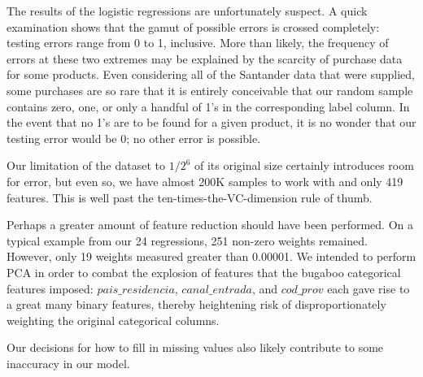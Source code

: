 \documentclass{report}
\begin{document}
The results of the logistic regressions are unfortunately suspect. A quick examination shows that the gamut of possible errors is crossed completely: testing errors range from 0 to 1, inclusive. More than likely, the frequency of errors at these two extremes may be explained by the scarcity of purchase data for some products. Even considering all of the Santander data that were supplied, some purchases are so rare that it is entirely conceivable that our random sample contains zero, one, or only a handful of 1's in the corresponding label column. In the event that no 1's are to be found for a given product, it is no wonder that our testing error would be 0; no other error is possible.

Our limitation of the dataset to $1/2^6$ of its original size certainly introduces room for error, but even so, we have almost 200K samples to work with and only 419 features. This is well past the ten-times-the-VC-dimension rule of thumb.\cite{amlbook} 

Perhaps a greater amount of feature reduction should have been performed. On a typical example from our 24 regressions, 251 non-zero weights remained. However, only 19 weights measured greater than 0.00001. We intended to perform PCA in order to combat the explosion of features that the bugaboo categorical features imposed: $pais\_residencia$, $canal\_entrada$, and $cod\_prov$ each gave rise to a great many binary features, thereby heightening risk of disproportionately weighting the original categorical columns.

Our decisions for how to fill in missing values also likely contribute to some inaccuracy in our model.
\end{document}
